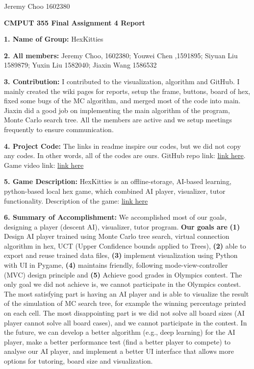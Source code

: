 \documentclass[12pt]{article}
\begin{document}
Jeremy Choo 1602380

\begin{center}
\textbf{CMPUT 355	Final Assignment 4 Report}
 \end{center} 

\textbf{1. Name of Group:} HexKitties

\textbf{2. All members:} Jeremy Choo, 1602380; Youwei Chen ,1591895; Siyuan Liu 1589879; Yuxin Liu 1582040; Jiaxin Wang 1586532

\textbf{3. Contribution:} I contributed to the visualization, algorithm and GitHub. I mainly created the wiki pages for reports, setup the frame, buttons, board of hex, fixed some bugs of the MC algorithm, and merged most of the code into main. Jiaxin did a good job on implementing the main algorithm of the program, Monte Carlo search tree. All the members are active and we setup meetings frequently to ensure communication.

\textbf{4. Project Code:} The links in readme inspire our codes, but we did not copy any codes. In other words, all of the codes are ours. GitHub repo link: \href{https://github.com/HexKitties/CMPUT355HexKitties}{link here}. Game video link: \href{https://github.com/HexKitties/CMPUT355HexKitties/blob/main/HexDemoFinal.mp4}{link here}

\textbf{5. Game Description:} HexKitties is an offline-storage, AI-based learning, python-based local hex game, which combined AI player, visualizer, tutor functionality. Description of the game: \href{http://www.mseymour.ca/hex_book/hexstrat.html}{link here}

\textbf{6. Summary of Accomplishment:} We accomplished most of our goals, designing a player (descent AI), visualizer, tutor program. \textbf{Our goals are} \textbf{(1)} Design AI player trained using Monte Carlo tree search, virtual connection algorithm in hex, UCT (Upper Confidence bounds applied to Trees), \textbf{(2)} able to export and reuse trained data files, \textbf{(3)} implement visualization using Python with UI in Pygame, \textbf{(4)} maintains friendly, following mode-view-controller (MVC) design principle and \textbf{(5)} Achieve good grades in Olympics contest. The only goal we did not achieve is, we cannot participate in the Olympics contest. The most satisfying part is having an AI player and is able to visualize the result of the simulation of MC search tree, for example the winning percentage printed on each cell. The most disappointing part is we did not solve all board sizes (AI player cannot solve all board cases), and we cannot participate in the contest. In the future, we can develop a better algorithm (e.g., deep learning) for the AI player, make a better performance test (find a better player to compete) to analyse our AI player, and implement a better UI interface that allows more options for tutoring, board size and visualization.
\end{document}
